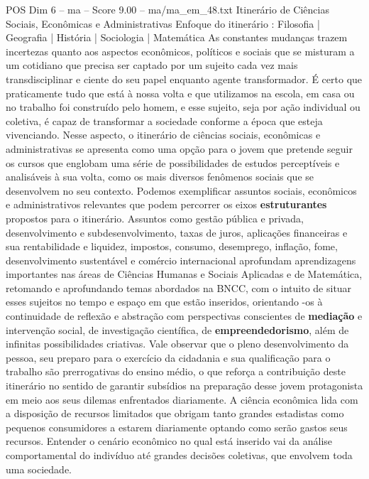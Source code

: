 \begin{textsample}{POS Dim 6 – ma – Score 9.00 – ma/ma\_em\_48.txt}  \label{ex:f6_pos_094}
Itinerário de Ciências Sociais, Econômicas e Administrativas Enfoque do itinerário : Filosofia | Geografia | História | Sociologia | Matemática As constantes mudanças trazem incertezas quanto aos aspectos econômicos, políticos e sociais que se misturam a um cotidiano que precisa ser captado por um sujeito cada vez mais transdisciplinar e ciente do seu papel enquanto agente transformador.
É certo que praticamente tudo que está à nossa volta e que utilizamos na escola, em casa ou no trabalho foi construído pelo homem, e esse sujeito, seja por ação individual ou coletiva, é capaz de transformar a sociedade conforme a época que esteja vivenciando.
Nesse aspecto, o itinerário de ciências sociais, econômicas e administrativas se apresenta como uma opção para o jovem que pretende seguir os cursos que englobam uma série de possibilidades de estudos perceptíveis e analisáveis à sua volta, como os mais diversos fenômenos sociais que se desenvolvem no seu contexto.
Podemos exemplificar assuntos sociais, econômicos e administrativos relevantes que podem percorrer os eixos \textbf{estruturantes} propostos para o itinerário.
Assuntos como gestão pública e privada, desenvolvimento e subdesenvolvimento, taxas de juros, aplicações financeiras e sua rentabilidade e liquidez, impostos, consumo, desemprego, inflação, fome, desenvolvimento sustentável e comércio internacional aprofundam aprendizagens importantes nas áreas de Ciências Humanas e Sociais Aplicadas e de Matemática, retomando e aprofundando temas abordados na BNCC, com o intuito de situar esses sujeitos no tempo e espaço em que estão inseridos, orientando -os à continuidade de reflexão e abstração com perspectivas conscientes de \textbf{mediação} e intervenção social, de investigação científica, de \textbf{empreendedorismo}, além de infinitas possibilidades criativas.
Vale observar que o pleno desenvolvimento da pessoa, seu preparo para o exercício da cidadania e sua qualificação para o trabalho são prerrogativas do ensino médio, o que reforça a contribuição deste itinerário no sentido de garantir subsídios na preparação desse jovem protagonista em meio aos seus dilemas enfrentados diariamente.
A ciência econômica lida com a disposição de recursos limitados que obrigam tanto grandes estadistas como pequenos consumidores a estarem diariamente optando como serão gastos seus recursos.
Entender o cenário econômico no qual está inserido vai da análise comportamental do indivíduo até grandes decisões coletivas, que envolvem toda uma sociedade.

\end{textsample}
